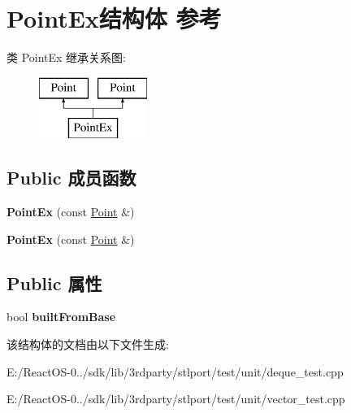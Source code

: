 \hypertarget{struct_point_ex}{}\section{Point\+Ex结构体 参考}
\label{struct_point_ex}
类 Point\+Ex 继承关系图\+:\begin{figure}[H]
\begin{center}
\leavevmode
\includegraphics[height=2.000000cm]{struct_point_ex}
\end{center}
\end{figure}
\subsection*{Public 成员函数}
\begin{DoxyCompactItemize}
\item 
\mbox{\label{struct_point_ex_ac72b8817138f7776744fbc50a4c7103e}} 
{\bfseries Point\+Ex} (const \hyperlink{struct_point}{Point} \&)
\item 
\mbox{\label{struct_point_ex_ac72b8817138f7776744fbc50a4c7103e}} 
{\bfseries Point\+Ex} (const \hyperlink{struct_point}{Point} \&)
\end{DoxyCompactItemize}
\subsection*{Public 属性}
\begin{DoxyCompactItemize}
\item 
\mbox{\label{struct_point_ex_afbc5339275fee359277b67db306c756a}} 
bool {\bfseries built\+From\+Base}
\end{DoxyCompactItemize}


该结构体的文档由以下文件生成\+:\begin{DoxyCompactItemize}
\item 
E\+:/\+React\+O\+S-\/0../sdk/lib/3rdparty/stlport/test/unit/deque\+\_\+test.\+cpp\item 
E\+:/\+React\+O\+S-\/0../sdk/lib/3rdparty/stlport/test/unit/vector\+\_\+test.\+cpp\end{DoxyCompactItemize}
